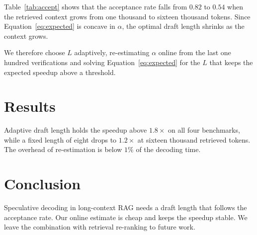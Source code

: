 \documentclass[11pt]{article}
\begin{document}
Table~\ref{tab:accept} shows that the acceptance rate falls from $0.82$ to $0.54$ when the retrieved context grows from one thousand to sixteen thousand tokens. Since Equation~\ref{eq:expected} is concave in $\alpha$, the optimal draft length shrinks as the context grows.

We therefore choose $L$ adaptively, re-estimating $\alpha$ online from the last one hundred verifications and solving Equation~\ref{eq:expected} for the $L$ that keeps the expected speedup above a threshold.

\section{Results}

Adaptive draft length holds the speedup above $1.8\times$ on all four benchmarks, while a fixed length of eight drops to $1.2\times$ at sixteen thousand retrieved tokens. The overhead of re-estimation is below $1\%$ of the decoding time.

\section{Conclusion}

Speculative decoding in long-context RAG needs a draft length that follows the acceptance rate. Our online estimate is cheap and keeps the speedup stable. We leave the combination with retrieval re-ranking to future work.



\end{document}
